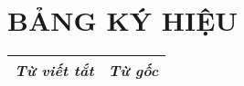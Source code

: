 \chapter*{BẢNG KÝ HIỆU}
\begin{longtable}{| c | c |}
\hline
\textbf{\textit{Từ viết tắt}} & \textbf{\textit{Từ gốc}} \\
\hline
\end{longtable}
